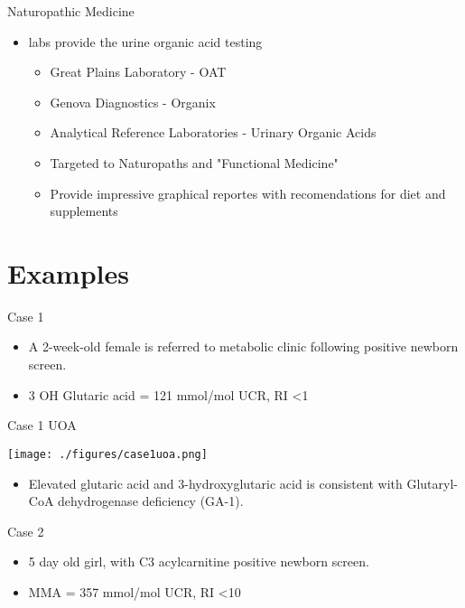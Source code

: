 \documentclass[presentation, smaller]{beamer}
\begin{document}
\begin{frame}[label={sec:org11f6cfb}]{Naturopathic Medicine}
\begin{itemize}
\item labs provide the urine organic acid testing 
\begin{itemize}
\item Great Plains Laboratory - OAT
\item Genova Diagnostics - Organix
\item Analytical Reference Laboratories - Urinary Organic Acids

\item Targeted to Naturopaths and  "Functional Medicine"
\item Provide impressive graphical reportes with recomendations for diet and supplements
\end{itemize}
\end{itemize}
\end{frame}

\section{Examples}
\label{sec:org8687904}

\begin{frame}[label={sec:org860fd2a}]{Case 1}
\begin{itemize}
\item A 2-week-old female is referred to metabolic clinic following positive newborn screen.
\item 3 OH Glutaric acid = 121 mmol/mol UCR, RI <1
\end{itemize}
\end{frame}

\begin{frame}[label={sec:orgb7398c7}]{Case 1 UOA}
\begin{center}
\texttt{[image: ./figures/case1uoa.png]}
\end{center}

\pause

\begin{itemize}
\item Elevated glutaric acid and 3-hydroxyglutaric acid is consistent with
Glutaryl-CoA dehydrogenase deficiency (GA-1).
\end{itemize}
\end{frame}

\begin{frame}[label={sec:org80cb0ac}]{Case 2}
\begin{itemize}
\item 5 day old girl, with C3 acylcarnitine positive newborn screen.
\item MMA = 357 mmol/mol UCR, RI <10
\end{itemize}
\end{frame}
\end{document}

